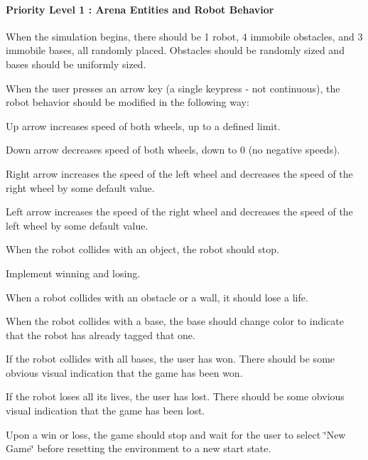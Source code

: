 \paragraph*{Priority Level 1 \+: Arena Entities and Robot Behavior}


\begin{DoxyItemize}
\item When the simulation begins, there should be 1 robot, 4 immobile obstacles, and 3 immobile bases, all randomly placed. Obstacles should be randomly sized and bases should be uniformly sized.
\item When the user presses an arrow key (a single keypress -\/ not continuous), the robot behavior should be modified in the following way\+:
\begin{DoxyItemize}
\item Up arrow increases speed of both wheels, up to a defined limit.
\item Down arrow decreases speed of both wheels, down to 0 (no negative speeds).
\item Right arrow increases the speed of the left wheel and decreases the speed of the right wheel by some default value.
\item Left arrow increases the speed of the right wheel and decreases the speed of the left wheel by some default value.
\end{DoxyItemize}
\item When the robot collides with an object, the robot should stop.
\item Implement winning and losing.
\begin{DoxyItemize}
\item When a robot collides with an obstacle or a wall, it should lose a life.
\item When the robot collides with a base, the base should change color to indicate that the robot has already tagged that one.
\begin{DoxyItemize}
\item If the robot collides with all bases, the user has won. There should be some obvious visual indication that the game has been won.
\end{DoxyItemize}
\item If the robot loses all its lives, the user has lost. There should be some obvious visual indication that the game has been lost.
\item Upon a win or loss, the game should stop and wait for the user to select \char`\"{}\+New Game\char`\"{} before resetting the environment to a new start state.
\end{DoxyItemize}
\end{DoxyItemize}

